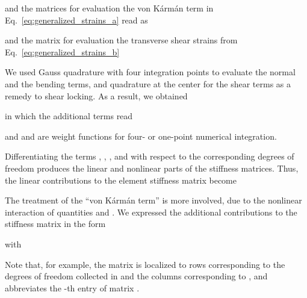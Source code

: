 \documentclass[11pt]{article}
\begin{document}
and the matrices for evaluation the von K\'{a}rm\'{a}n term in Eq.~\eqref{eq:generalized_strains_a} read as

and the matrix for evaluation the transverse shear strains from Eq.~\eqref{eq:generalized_strains_b}


We used  Gauss quadrature with four integration points  to evaluate the normal and the
bending terms, and  quadrature at the center for the shear terms as a remedy to shear locking. As a result, we obtained


in which the additional terms read 

and  and  are weight functions for four- or one-point numerical integration.

Differentiating the terms , , , and  with respect to the corresponding degrees of freedom
produces the linear and nonlinear parts of the stiffness matrices. Thus, the linear contributions to the element
stiffness matrix become

The treatment of the ``von K\'{a}rm\'{a}n term'' is more involved, due to the nonlinear interaction of quantities
 and . We expressed the additional contributions to the stiffness matrix in the form

with

Note that, for example, the matrix  is localized to rows corresponding to the degrees of freedom collected in  and the columns corresponding to , and  abbreviates the -th entry of matrix . 
\end{document}
